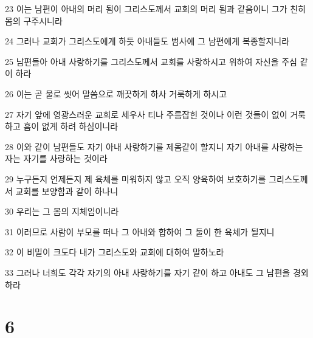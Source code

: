 \par 23 이는 남편이 아내의 머리 됨이 그리스도께서 교회의 머리 됨과 같음이니 그가 친히 몸의 구주시니라
\par 24 그러나 교회가 그리스도에게 하듯 아내들도 범사에 그 남편에게 복종할지니라
\par 25 남편들아 아내 사랑하기를 그리스도께서 교회를 사랑하시고 위하여 자신을 주심 같이 하라
\par 26 이는 곧 물로 씻어 말씀으로 깨끗하게 하사 거룩하게 하시고
\par 27 자기 앞에 영광스러운 교회로 세우사 티나 주름잡힌 것이나 이런 것들이 없이 거룩하고 흠이 없게 하려 하심이니라
\par 28 이와 같이 남편들도 자기 아내 사랑하기를 제몸같이 할지니 자기 아내를 사랑하는 자는 자기를 사랑하는 것이라
\par 29 누구든지 언제든지 제 육체를 미워하지 않고 오직 양육하여 보호하기를 그리스도께서 교회를 보양함과 같이 하나니
\par 30 우리는 그 몸의 지체임이니라
\par 31 이러므로 사람이 부모를 떠나 그 아내와 합하여 그 둘이 한 육체가 될지니
\par 32 이 비밀이 크도다 내가 그리스도와 교회에 대하여 말하노라
\par 33 그러나 너희도 각각 자기의 아내 사랑하기를 자기 같이 하고 아내도 그 남편을 경외하라

\chapter{6}

